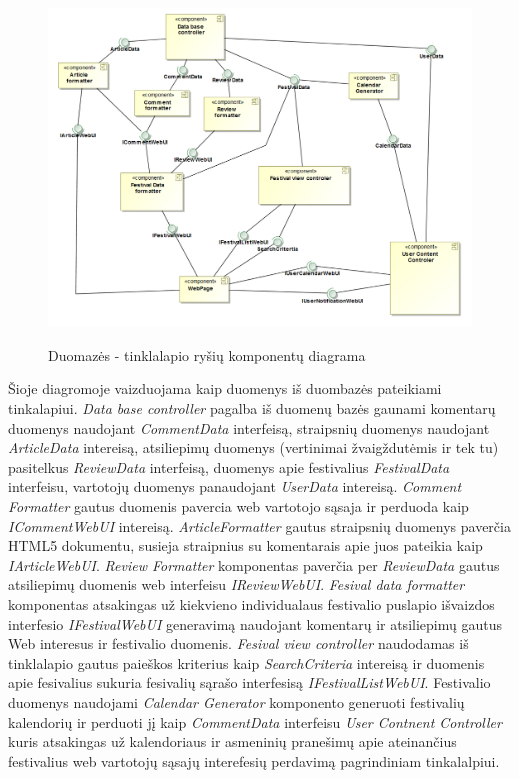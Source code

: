 ﻿\documentclass{VUMIFPSkursinis}
\begin{document}
\begin{figure}[H]
\centering
    \includegraphics[scale=0.55]{img/PSI3/DataToWeb.PNG}
	\label{mantas:1}
	\caption{Duomazės - tinklalapio ryšių komponentų diagrama}
\end{figure}
Šioje diagromoje vaizduojama kaip duomenys iš duombazės pateikiami tinkalapiui.
 \textit{Data base controller} pagalba iš duomenų bazės gaunami komentarų duomenys naudojant \textit{CommentData} interfeisą, straipsnių duomenys naudojant \textit{ArticleData} intereisą, atsiliepimų duomenys (vertinimai žvaigždutėmis ir tek tu) pasitelkus \textit{ReviewData} interfeisą, duomenys apie festivalius \textit{FestivalData} interfeisu, vartotojų duomenys panaudojant \textit{UserData} intereisą.
 \textit{Comment Formatter} gautus duomenis pavercia web vartotojo sąsaja ir perduoda kaip \textit{ICommentWebUI} intereisą.
 \textit{ArticleFormatter} gautus straipsnių duomenys paverčia HTML5 dokumentu, susieja straipnius su komentarais apie juos pateikia kaip \textit{IArticleWebUI}.
 \textit{Review Formatter} komponentas paverčia per \textit{ReviewData} gautus atsiliepimų duomenis web interfeisu \textit{IReviewWebUI}.
 \textit{Fesival data formatter} komponentas atsakingas už kiekvieno individualaus festivalio puslapio išvaizdos interfesio \textit{IFestivalWebUI} generavimą naudojant komentarų ir atsiliepimų gautus Web interesus ir festivalio duomenis.
 \textit{Fesival view controller} naudodamas iš tinklalapio gautus paieškos kriterius kaip \textit{SearchCriteria} intereisą ir duomenis apie fesivalius sukuria fesivalių sąrašo interfesisą \textit{IFestivalListWebUI}.
 Festivalio duomenys naudojami \textit{Calendar Generator} komponento generuoti festivalių kalendorių ir perduoti jį kaip \textit{CommentData} interfeisu \textit{User Contnent Controller} kuris atsakingas už kalendoriaus ir asmeninių pranešimų apie ateinančius festivalius web vartotojų sąsajų interefesių perdavimą pagrindiniam tinkalalpiui.    
\end{document}
